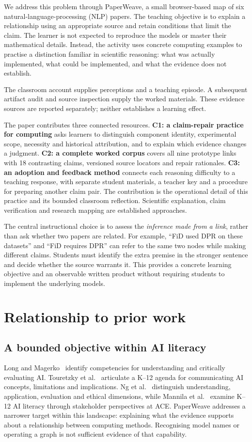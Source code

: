 We address this problem through PaperWeave, a small browser-based map of six natural-language-processing (NLP) papers. The teaching objective is to explain a relationship using an appropriate source and retain conditions that limit the claim. The learner is not expected to reproduce the models or master their mathematical details. Instead, the activity uses concrete computing examples to practise a distinction familiar in scientific reasoning: what was actually implemented, what could be implemented, and what the evidence does not establish.

The classroom account supplies perceptions and a teaching episode. A subsequent artifact audit and source inspection supply the worked materials. These evidence sources are reported separately; neither establishes a learning effect.

The paper contributes three connected resources. \textbf{C1: a claim-repair practice for computing} asks learners to distinguish component identity, experimental scope, necessity and historical attribution, and to explain which evidence changes a judgment. \textbf{C2: a complete worked corpus} covers all nine prototype links with 18 contrasting claims, versioned source locators and repair rationales. \textbf{C3: an adoption and feedback method} connects each reasoning difficulty to a teaching response, with separate student materials, a teacher key and a procedure for preparing another claim pair. The contribution is the operational detail of this practice and its bounded classroom reflection. Scientific explanation, claim verification and research mapping are established approaches.

The central instructional choice is to assess the \emph{inference made from a link}, rather than ask whether two papers are related. For example, ``FiD used DPR on these datasets'' and ``FiD requires DPR'' can refer to the same two nodes while making different claims. Students must identify the extra premise in the stronger sentence and decide whether the source warrants it. This provides a concrete learning objective and an observable written product without requiring students to implement the underlying models.

\section{Relationship to prior work}
\subsection{A bounded objective within AI literacy}
Long and Magerko~\cite{long} identify competencies for understanding and critically evaluating AI. Touretzky et al.~\cite{touretzky} articulate a K--12 agenda for communicating AI concepts, limitations and implications. Ng et al.~\cite{ng} distinguish understanding, application, evaluation and ethical dimensions, while Mannila et al.~\cite{mannila} examine K--12 AI literacy through stakeholder perspectives at ACE. PaperWeave addresses a narrower target within this landscape: explaining what the evidence supports about a relationship between computing methods. Recognising model names or operating a graph is not sufficient evidence of that capability.

